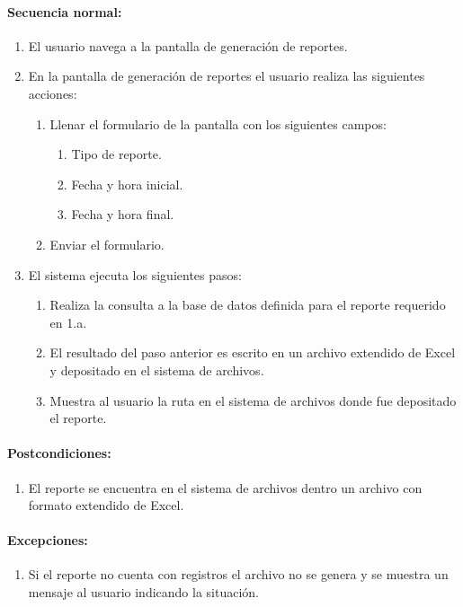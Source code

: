 \paragraph{Secuencia normal:}
\begin{enumerate}
  \item El usuario navega a la pantalla de generación de reportes.
  \item En la pantalla de generación de reportes el usuario realiza las siguientes acciones:
    \begin{enumerate}
    \item Llenar el formulario de la pantalla con los siguientes campos:
    \begin{enumerate}
      \item Tipo de reporte.
      \item Fecha y hora inicial.
      \item Fecha y hora final.
    \end{enumerate}
    \item Enviar el formulario.
  \end{enumerate}
  \item El sistema ejecuta los siguientes pasos:
  \begin{enumerate}
    \item Realiza la consulta a la base de datos definida para el reporte requerido en 1.a.
    \item El resultado del paso anterior es escrito en un archivo extendido de Excel\textsuperscript{\textcopyright} y depositado en el sistema de archivos.
    \item Muestra al usuario la ruta en el sistema de archivos donde fue depositado el reporte.
  \end{enumerate}
\end{enumerate}
\paragraph{Postcondiciones:}
\begin{enumerate}
  \item El reporte se encuentra en el sistema de archivos dentro un archivo con formato extendido de Excel\textsuperscript{\textcopyright}.
\end{enumerate}
\paragraph{Excepciones:}
\begin{enumerate}
  \item Si el reporte no cuenta con registros el archivo no se genera y se muestra un mensaje al usuario indicando la situación.
\end{enumerate}


